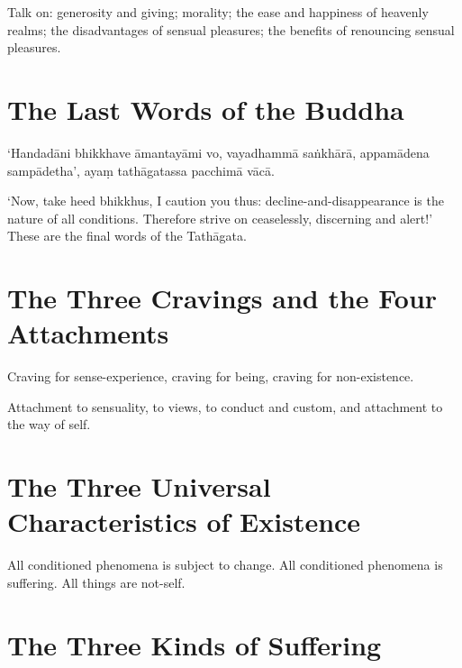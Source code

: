 Talk on: generosity and giving; morality; the ease and happiness of heavenly
realms; the disadvantages of sensual pleasures; the benefits of renouncing
sensual pleasures.


\vspace*{-\baselineskip}

\section*{The Last Words of the Buddha}

‘Handadāni bhikkhave āmantayāmi vo, vayadhammā saṅkhārā, appamādena sampādetha’,
ayaṃ tathāgatassa pacchimā vācā.

‘Now, take heed bhikkhus, I caution you thus: decline-and-disappearance is the
nature of all conditions. Therefore strive on ceaselessly, discerning and
alert!’ These are the final words of the Tathāgata.


\section*{The Three Cravings and the Four Attachments}

Craving for sense-experience, craving for being, craving for non-existence.

Attachment to sensuality, to views, to conduct and custom, and attachment to the
way of self.


\vspace*{-\baselineskip}

\section*{The Three Universal Characteristics of Existence}

All conditioned phenomena is subject to change.
All conditioned phenomena is suffering.
All things are not-self.


\vspace*{-\baselineskip}

\section*{The Three Kinds of Suffering}

